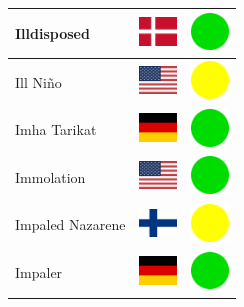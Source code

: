 \documentclass[12pt, a4paper, twoside]{report}
\begin{document}
\begin{center}
\begin{longtable}{|p{5cm}|p{2cm}|p{2cm}|}
 Illdisposed                                                & \includegraphics[width=1cm]{../img/flags/dk} &   \includegraphics[width=1cm]{../likes/y} \\ \hline
 Ill Niño                                                   & \includegraphics[width=1cm]{../img/flags/us} &   \includegraphics[width=1cm]{../likes/m} \\ \hline
 Imha Tarikat                                               & \includegraphics[width=1cm]{../img/flags/de} &   \includegraphics[width=1cm]{../likes/y} \\ \hline
 Immolation                                                 & \includegraphics[width=1cm]{../img/flags/us} &   \includegraphics[width=1cm]{../likes/y} \\ \hline
 Impaled Nazarene                                           & \includegraphics[width=1cm]{../img/flags/fi} &   \includegraphics[width=1cm]{../likes/m} \\ \hline
 Impaler                                                    & \includegraphics[width=1cm]{../img/flags/de} &   \includegraphics[width=1cm]{../likes/y} \\ \hline

\end{longtable}
\end{center}
\end{document}
